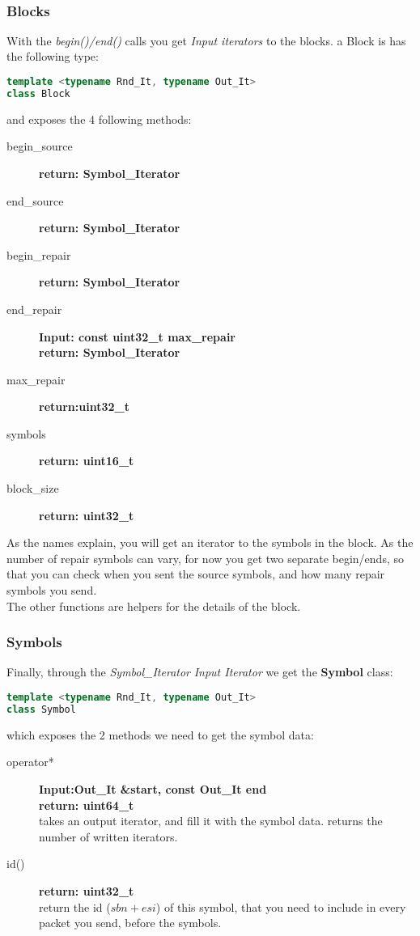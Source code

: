 \documentclass[11pt,a4paper]{refart}
\begin{document}
~\\

\subsubsection{Blocks}
With the \textit{begin()/end()} calls you get \textit{Input iterators} to the blocks. a Block is has the following type:
\begin{lstlisting}[language=C++]
template <typename Rnd_It, typename Out_It>
class Block
\end{lstlisting}

and exposes the 4 following methods:
\begin{description}
\item[begin\_source]\textbf{return: Symbol\_Iterator}
\item[end\_source]\textbf{return: Symbol\_Iterator}
\item[begin\_repair]\textbf{return: Symbol\_Iterator}
\item[end\_repair]\textbf{Input: const uint32\_t max\_repair}\\
\textbf{return: Symbol\_Iterator}
\item[max\_repair]\textbf{return:uint32\_t}
\item[symbols]\textbf{return: uint16\_t}
\item[block\_size]\textbf{return: uint32\_t}
\end{description}

As the names explain, you will get an iterator to the symbols in the block. As the number of repair symbols can vary, for now you get two separate begin/ends,
so that you can check when you sent the source symbols, and how many repair symbols you send.\\
The other functions are helpers for the details of the block.


\subsubsection{Symbols}
Finally, through the \textit{Symbol\_Iterator} \textit{Input Iterator} we get the \textbf{Symbol} class:
\begin{lstlisting}[language=C++]
template <typename Rnd_It, typename Out_It>
class Symbol
\end{lstlisting}

which exposes the 2 methods we need to get the symbol data:

\begin{description}
\item[operator*]\textbf{Input:Out\_It \&start, const Out\_It end}\\
\textbf{return: uint64\_t}\\
takes an output iterator, and fill it with the symbol data. returns the number of written iterators.
\item[id()]\textbf{return: uint32\_t}\\
return the id (\textit{$sbn + esi$}) of this symbol, that you need to include in every packet you send, before the symbols.
\end{description}
\end{document}
